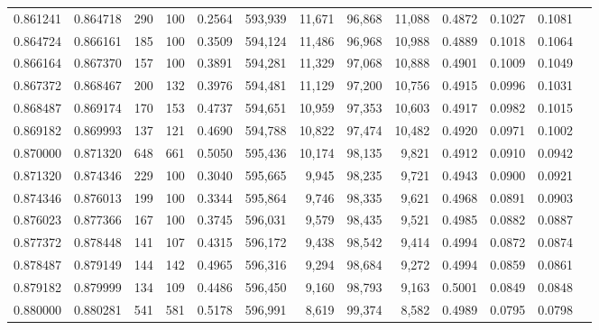 \begin{tabular}{rrrrrrrrrrrrr}
0.861241 & 0.864718 &   290 & 100 &                                     0.2564 & 593,939 &  11,671 &  96,868 &  11,088 & 0.4872 & 0.1027 & 0.1081 \\
0.864724 & 0.866161 &   185 & 100 &                                     0.3509 & 594,124 &  11,486 &  96,968 &  10,988 & 0.4889 & 0.1018 & 0.1064 \\
0.866164 & 0.867370 &   157 & 100 &                                     0.3891 & 594,281 &  11,329 &  97,068 &  10,888 & 0.4901 & 0.1009 & 0.1049 \\
0.867372 & 0.868467 &   200 & 132 &                                     0.3976 & 594,481 &  11,129 &  97,200 &  10,756 & 0.4915 & 0.0996 & 0.1031 \\
0.868487 & 0.869174 &   170 & 153 &                                     0.4737 & 594,651 &  10,959 &  97,353 &  10,603 & 0.4917 & 0.0982 & 0.1015 \\
0.869182 & 0.869993 &   137 & 121 &                                     0.4690 & 594,788 &  10,822 &  97,474 &  10,482 & 0.4920 & 0.0971 & 0.1002 \\
0.870000 & 0.871320 &   648 & 661 &                                     0.5050 & 595,436 &  10,174 &  98,135 &   9,821 & 0.4912 & 0.0910 & 0.0942 \\
0.871320 & 0.874346 &   229 & 100 &                                     0.3040 & 595,665 &   9,945 &  98,235 &   9,721 & 0.4943 & 0.0900 & 0.0921 \\
0.874346 & 0.876013 &   199 & 100 &                                     0.3344 & 595,864 &   9,746 &  98,335 &   9,621 & 0.4968 & 0.0891 & 0.0903 \\
0.876023 & 0.877366 &   167 & 100 &                                     0.3745 & 596,031 &   9,579 &  98,435 &   9,521 & 0.4985 & 0.0882 & 0.0887 \\
0.877372 & 0.878448 &   141 & 107 &                                     0.4315 & 596,172 &   9,438 &  98,542 &   9,414 & 0.4994 & 0.0872 & 0.0874 \\
0.878487 & 0.879149 &   144 & 142 &                                     0.4965 & 596,316 &   9,294 &  98,684 &   9,272 & 0.4994 & 0.0859 & 0.0861 \\
0.879182 & 0.879999 &   134 & 109 &                                     0.4486 & 596,450 &   9,160 &  98,793 &   9,163 & 0.5001 & 0.0849 & 0.0848 \\
0.880000 & 0.880281 &   541 & 581 &                                     0.5178 & 596,991 &   8,619 &  99,374 &   8,582 & 0.4989 & 0.0795 & 0.0798 \\

\end{tabular}
